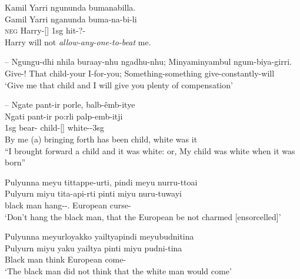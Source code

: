 \documentclass{langscibook}
\begin{document}
\ea\label{ex:1:1}
\glll Kamil Yarri ngununda bumanabilla. \\
Gamil Yarri nganunda buma-na-bi-li\\
\textsc{neg} Harry-[] 1sg hit-?-\footnotemark{}\\
\glt Harry will not \textit{allow-any-one-to-beat} me. \\
\citep[76]{ridley_kamilaroi_1855-1}
\z{}




--
\ea \label{ex:1:2}
\gll Ngungu-dhi nhila buraay-nhu ngadhu-nhu; Minyaminyambul ngum-biya-girri. \\
Give-! That child-your I-for-you; Something-something give-constantly-will\\
\glt `Give me that child and I will give you plenty of compensation' \\

\z 





--
\ea\label{ex:1:3}
\glll Ngate pant-ir porle, balb-êmb-itye \\
Ngati pant-ir po:rli palp-emb-itji\\
1sg bear- child-[] white--3sg\\
\glt By me (a) bringing forth has been child, white was it \\
“I brought forward a child and it was white: or, My child was white when it was born” \\
\citep[36]{meyer_vocabulary_1843}
\z



\ea
\glll Pulyunna meyu tittappe-urti, pindi  meyu nurru-ttoai \\
Pulyurn miyu tita-api-rti pinti miyu nuru-tuwayi\\
black man hang--.  European curse-\\
\glt `Don’t hang the black man, that the European be not charmed [ensorcelled]' \\
\citep[69]{teichelmann_outlines_1840}
\z
	       
\ea
\glll Pulyunna meyurloyakko yailtyapindi meyubudnitina \\
Pulyurn {miyu yaku} {yailtya pinti} {miyu pudni-tina}\\
Black man  think European come-\\
\glt `The black man did not think that the white man would come' \\
\citep[69]{teichelmann_outlines_1840}
\z
\end{document}

